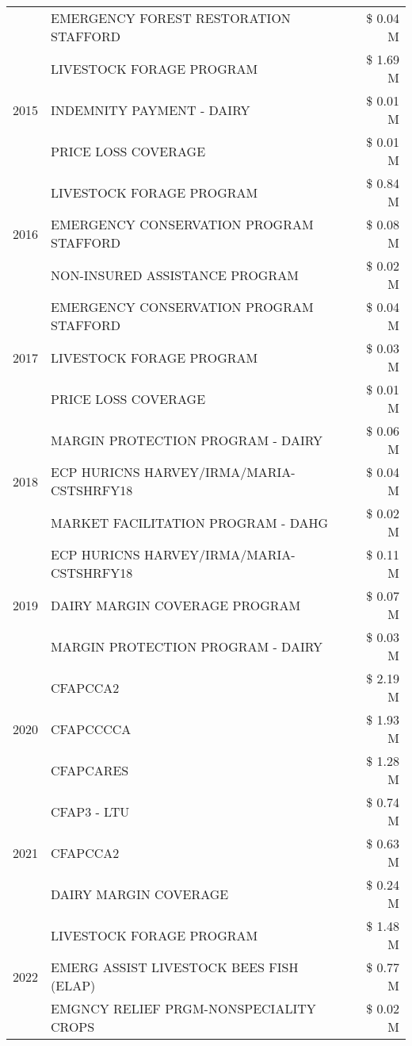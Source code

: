\begin{tabular}{llr}
 & EMERGENCY FOREST RESTORATION STAFFORD & \$ 0.04 M \\
\cline{1-3}
\multirow[t]{3}{*}{2015} & LIVESTOCK FORAGE PROGRAM & \$ 1.69 M \\
 & INDEMNITY PAYMENT - DAIRY & \$ 0.01 M \\
 & PRICE LOSS COVERAGE & \$ 0.01 M \\
\cline{1-3}
\multirow[t]{3}{*}{2016} & LIVESTOCK FORAGE PROGRAM & \$ 0.84 M \\
 & EMERGENCY CONSERVATION PROGRAM STAFFORD & \$ 0.08 M \\
 & NON-INSURED ASSISTANCE PROGRAM & \$ 0.02 M \\
\cline{1-3}
\multirow[t]{3}{*}{2017} & EMERGENCY CONSERVATION PROGRAM STAFFORD & \$ 0.04 M \\
 & LIVESTOCK FORAGE PROGRAM & \$ 0.03 M \\
 & PRICE LOSS COVERAGE & \$ 0.01 M \\
\cline{1-3}
\multirow[t]{3}{*}{2018} & MARGIN PROTECTION PROGRAM - DAIRY & \$ 0.06 M \\
 & ECP HURICNS HARVEY/IRMA/MARIA-CSTSHRFY18 & \$ 0.04 M \\
 & MARKET FACILITATION PROGRAM - DAHG & \$ 0.02 M \\
\cline{1-3}
\multirow[t]{3}{*}{2019} & ECP HURICNS HARVEY/IRMA/MARIA-CSTSHRFY18 & \$ 0.11 M \\
 & DAIRY MARGIN COVERAGE PROGRAM & \$ 0.07 M \\
 & MARGIN PROTECTION PROGRAM - DAIRY & \$ 0.03 M \\
\cline{1-3}
\multirow[t]{3}{*}{2020} & CFAPCCA2 & \$ 2.19 M \\
 & CFAPCCCCA & \$ 1.93 M \\
 & CFAPCARES & \$ 1.28 M \\
\cline{1-3}
\multirow[t]{3}{*}{2021} & CFAP3 - LTU & \$ 0.74 M \\
 & CFAPCCA2 & \$ 0.63 M \\
 & DAIRY MARGIN COVERAGE & \$ 0.24 M \\
\cline{1-3}
\multirow[t]{3}{*}{2022} & LIVESTOCK FORAGE PROGRAM & \$ 1.48 M \\
 & EMERG ASSIST LIVESTOCK BEES FISH (ELAP) & \$ 0.77 M \\
 & EMGNCY RELIEF PRGM-NONSPECIALITY CROPS & \$ 0.02 M \\
\cline{1-3}
\bottomrule
\end{tabular}

